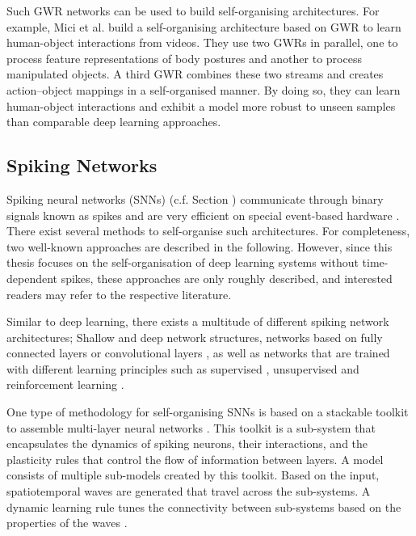 Such GWR networks can be used to build self-organising architectures.
For example, Mici et al.  build a self-organising architecture based on GWR to learn human-object interactions from videos.
They use two GWRs in parallel, one to process feature representations of body postures and another to process manipulated objects.
A third GWR combines these two streams and creates action–object mappings in a self-organised manner.
By doing so, they can learn human-object interactions and exhibit a model more robust to unseen samples than comparable deep learning approaches.


\subsection{Spiking Networks}
Spiking neural networks (SNNs) (c.f. Section ) communicate through binary signals known as spikes and are very efficient on special event-based hardware .
There exist several methods to self-organise such architectures.
For completeness, two well-known approaches are described in the following.
However, since this thesis focuses on the self-organisation of deep learning systems without time-dependent spikes, these approaches are only roughly described, and interested readers may refer to the respective literature.

Similar to deep learning, there exists a multitude of different spiking network architectures; Shallow  and deep  network structures, networks based on fully connected layers \cite{diehl2015unsupervised} or convolutional layers , as well as networks that are trained with different learning principles such as supervised , unsupervised  and reinforcement learning .

One type of methodology for self-organising SNNs is based on a stackable toolkit to assemble multi-layer neural networks .
This toolkit is a sub-system that encapsulates the dynamics of spiking neurons, their interactions, and the plasticity rules that control the flow of information between layers.
A model consists of multiple sub-models created by this toolkit.
Based on the input, spatiotemporal waves are generated that travel across the sub-systems.
A dynamic learning rule tunes the connectivity between sub-systems based on the properties of the waves .

